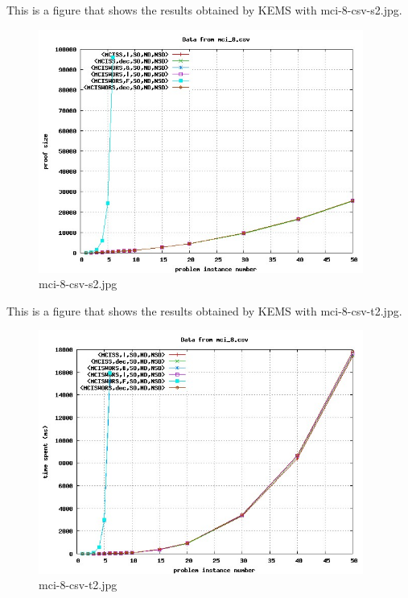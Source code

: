 This is a figure that shows the results obtained by KEMS with mci-8-csv-s2.jpg.
\begin{figure}[htbp]
\begin{center}
\includegraphics[width=0.95\textwidth]{figuras/mci-8-csv-s2.jpg}
\end{center}
\caption{mci-8-csv-s2.jpg}
\end{figure}

This is a figure that shows the results obtained by KEMS with mci-8-csv-t2.jpg.
\begin{figure}[htbp]
\begin{center}
\includegraphics[width=0.95\textwidth]{figuras/mci-8-csv-t2.jpg}
\end{center}
\caption{mci-8-csv-t2.jpg}
\end{figure}

